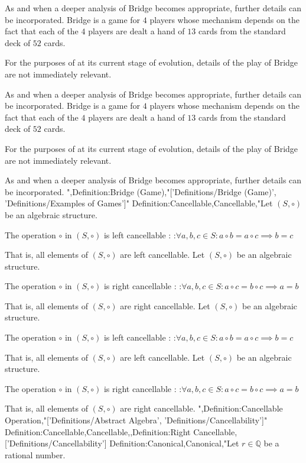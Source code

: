 As and when a deeper analysis of Bridge becomes appropriate, further details can be incorporated.
Bridge is a game for $4$ players whose mechanism depends on the fact that each of the $4$ players are dealt a hand of $13$ cards from the standard deck of $52$ cards.


For the purposes of  at its current stage of evolution, details of the play of Bridge are not immediately relevant.

As and when a deeper analysis of Bridge becomes appropriate, further details can be incorporated.
Bridge is a game for $4$ players whose mechanism depends on the fact that each of the $4$ players are dealt a hand of $13$ cards from the standard deck of $52$ cards.


For the purposes of  at its current stage of evolution, details of the play of Bridge are not immediately relevant.

As and when a deeper analysis of Bridge becomes appropriate, further details can be incorporated.
",Definition:Bridge (Game),"['Definitions/Bridge (Game)', 'Definitions/Examples of Games']"
Definition:Cancellable,Cancellable,"Let $\left( S, \circ \right)$ be an algebraic structure.


The operation $\circ$ in $\left( S, \circ \right)$ is left cancellable :
:$\forall a, b, c \in S: a \circ b = a \circ c \implies b = c$

That is,  all elements of $\left( S, \circ \right)$ are left cancellable.
Let $\left( S, \circ \right)$ be an algebraic structure.


The operation $\circ$ in $\left( S, \circ \right)$ is right cancellable :
:$\forall a, b, c \in S: a \circ c = b \circ c \implies a = b$

That is,  all elements of $\left( S, \circ \right)$ are right cancellable.
Let $\left( S, \circ \right)$ be an algebraic structure.


The operation $\circ$ in $\left( S, \circ \right)$ is left cancellable :
:$\forall a, b, c \in S: a \circ b = a \circ c \implies b = c$

That is,  all elements of $\left( S, \circ \right)$ are left cancellable.
Let $\left( S, \circ \right)$ be an algebraic structure.


The operation $\circ$ in $\left( S, \circ \right)$ is right cancellable :
:$\forall a, b, c \in S: a \circ c = b \circ c \implies a = b$

That is,  all elements of $\left( S, \circ \right)$ are right cancellable.
",Definition:Cancellable Operation,"['Definitions/Abstract Algebra', 'Definitions/Cancellability']"
Definition:Cancellable,Cancellable,,Definition:Right Cancellable,['Definitions/Cancellability']
Definition:Canonical,Canonical,"Let $r \in \mathbb Q$ be a rational number.

